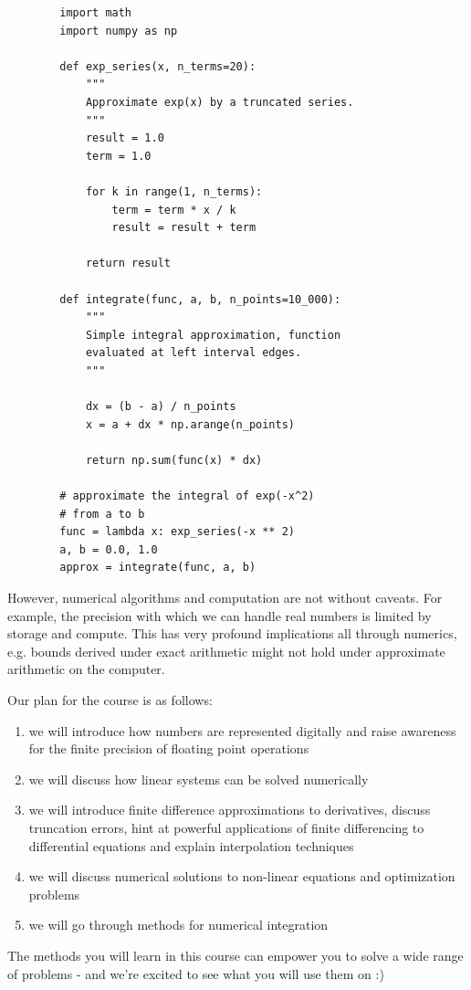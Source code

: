 \begin{codebox}
    \begin{verbatim}
        import math
        import numpy as np

        def exp_series(x, n_terms=20):
            """
            Approximate exp(x) by a truncated series.
            """
            result = 1.0
            term = 1.0

            for k in range(1, n_terms):
                term = term * x / k
                result = result + term

            return result

        def integrate(func, a, b, n_points=10_000):
            """
            Simple integral approximation, function 
            evaluated at left interval edges.
            """

            dx = (b - a) / n_points
            x = a + dx * np.arange(n_points)

            return np.sum(func(x) * dx)

        # approximate the integral of exp(-x^2)
        # from a to b
        func = lambda x: exp_series(-x ** 2)
        a, b = 0.0, 1.0
        approx = integrate(func, a, b)
    \end{verbatim}
    \caption{Python code for approximating $\int_a^b \exp{(-x^2)} \, dx$.}
    \label{code:integral_approx}
\end{codebox}


However, numerical algorithms and computation 
are not without caveats. For example, the precision with which
we can handle real numbers is limited by storage and compute. This
has very profound implications all through numerics, e.g. bounds derived
under exact arithmetic might not hold under approximate arithmetic on the
computer.

Our plan for the course is as follows:

\begin{enumerate}
    \item we will introduce how numbers are represented digitally and raise awareness for the finite precision of floating point operations
    \item we will discuss how linear systems can be solved numerically
    \item we will introduce finite difference approximations to derivatives, discuss truncation 
    errors, hint at powerful applications of finite differencing to differential 
    equations and explain interpolation techniques
    \item we will discuss numerical solutions to non-linear equations and optimization problems
    \item we will go through methods for numerical integration
\end{enumerate}

The methods you will learn in this course can empower you to solve a wide range of problems - and
we're excited to see what you will use them on :)

\pagebreak